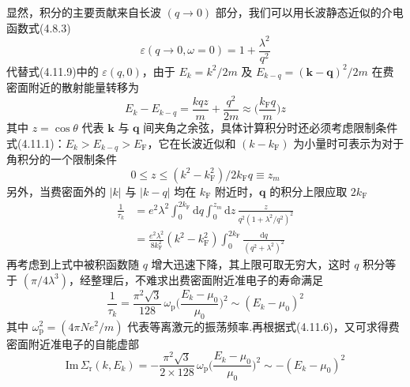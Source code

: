 显然，积分的主要贡献来自长波 $(q\to 0)$ 部分，我们可以用长波静态近似的介电函数式(4.8.3)
\begin{equation*}
  \varepsilon(q\to 0,\omega=0)=1+\frac{\lambda^{2}}{q^{2}}
\end{equation*}
代替式(4.11.9)中的 $\varepsilon(q,0)$，由于 $E_{k}=k^{2}/2m$ 及
$E_{k-q}=(\boldsymbol{k}-\boldsymbol{q})^{2}/2m$ 在费密面附近的散射能量转移为
\begin{equation}
  E_{k}-E_{k-q}=\frac{kqz}{m}+\frac{q^{2}}{2m}
  \approx\bigg(\frac{k_{\mathrm{F}}q}{m}\bigg)z
\end{equation}
其中 $z=\cos\theta$ 代表 $\boldsymbol{k}$ 与 $\boldsymbol{q}$ 间夹角之余弦，具体计算积分时还必须考虑限制条件式(4.11.1)：$E_{k}>E_{k-q}>E_{\mathrm{F}}$，它在长波近似和 $\left(k-k_{\mathrm{F}}\right)$ 为小量时可表示为对于角积分的一个限制条件
\begin{equation}
  0\leqslant z\leqslant\left(k^{2}-k_{\mathrm{F}}^{2}\right)/2k_{\mathrm{F}}q
  \equiv z_{m}
\end{equation}
另外，当费密面外的 $|k|$ 与 $|k-q|$ 均在 $k_{\mathrm{F}}$ 附近时，$\boldsymbol{q}$ 的积分上限应取 $2k_{\mathrm{F}}$
\begin{equation}
\begin{aligned}
  \frac{1}{\tau_{k}}
  &=e^{2}\lambda^{2}\int_{0}^{2k_{\mathrm{F}}}\mathrm{d}q
  \int_{0}^{z_{m}}\mathrm{d}z\,
  \frac{z}{q^{2}\left(1+\lambda^{2}/q^{2}\right)^{2}}\\
  &=\frac{e^{2}\lambda^{2}}{8k_{\mathrm{F}}^{2}}
  \left(k^{2}-k_{\mathrm{F}}^{2}\right)
  \int_{0}^{2k_{\mathrm{F}}}\frac{\mathrm{d}q}{\left(q^{2}+\lambda^{2}\right)^{2}}
\end{aligned}
\end{equation}
再考虑到上式中被积函数随 $q$ 增大迅速下降，其上限可取无穷大，这时 $q$ 积分等于 $\left(\pi/4\lambda^{3}\right)$，经整理后，不难求出费密面附近准电子的寿命满足
\begin{equation}
  \frac{1}{\tau_{k}}=\frac{\pi^{2}\sqrt{3}}{128}\,\omega_{\mathrm{p}}
  \bigg(\frac{E_{k}-\mu_{0}}{\mu_{0}}\bigg)^{2}
  \sim\left(E_{k}-\mu_{0}\right)^{2}
\end{equation}
其中 $\omega_{\mathrm{p}}^{2}=\left(4\pi Ne^{2}/m\right)$ 代表等离激元的振荡频率.再根据式(4.11.6)，又可求得费密面附近准电子的自能虚部
\begin{equation}
  \mathrm{Im}\,\varSigma_{\mathrm{r}}(k,E_{k})
  =-\frac{\pi^{2}\sqrt{3}}{2\times 128}\,\omega_{\mathrm{p}}
  \bigg(\frac{E_{k}-\mu_{0}}{\mu_{0}}\bigg)^{2}
  \sim-\left(E_{k}-\mu_{0}\right)^{2}
\end{equation}
